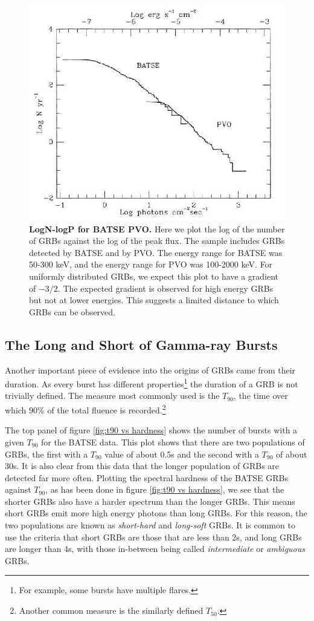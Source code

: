 \documentclass[11pt]{cuthesis}
\begin{document}
\begin{figure} %
\begin{center}
\includegraphics[width=0.8\linewidth]{logN-logP.png}
\end{center}
\caption{\textbf{LogN-logP for BATSE PVO.} Here we plot the log of the number of GRBs against the log of the peak flux. The sample includes GRBs detected by BATSE and by PVO. The energy range for BATSE was 50-300 keV, and the energy range for PVO was 100-2000 keV. For uniformly distributed GRBs, we expect this plot to have a gradient of $-3/2$. The expected gradient is observed for high energy GRBs but not at lower energies. This suggests a limited distance to which GRBs can be observed. \cite{batse_vpo2, batse_vpo1}
}
\label{fig:logn - logp}
\end{figure}

\subsection{The Long and Short of Gamma-ray Bursts}
Another important piece of evidence into the origins of GRBs came from their duration. As every burst has different properties\footnote{For example, some bursts have multiple flares.} the duration of a GRB is not trivially defined. The measure most commonly used is the $T_{90}$, the time over which $90\%$ of the total fluence is recorded.\footnote{Another common measure is the similarly defined $T_{50}$.} 

The top panel of figure \ref{fig:t90 vs hardness} shows the number of bursts with a given $T_{90}$ for the BATSE data. This plot shows that there are two populations of GRBs, the first with a $T_{90}$ value of about 0.5s and the second with a $T_{90}$ of about 30s. It is also clear from this data that the longer population of GRBs are detected far more often. Plotting the spectral hardness of the BATSE GRBs against $T_{90}$, as has been done in figure \ref{fig:t90 vs hardness}, we see that the shorter GRBs also have a harder spectrum than the longer GRBs. This means short GRBs emit more high energy photons than long GRBs. For this reason, the two populations are known as \textit{short-hard} and \textit{long-soft} GRBs. It is common to use the criteria that short GRBs are those that are less than 2s, and long GRBs are longer than 4s, with those in-between being called \textit{intermediate} or \textit{ambiguous} GRBs.
\end{document}
